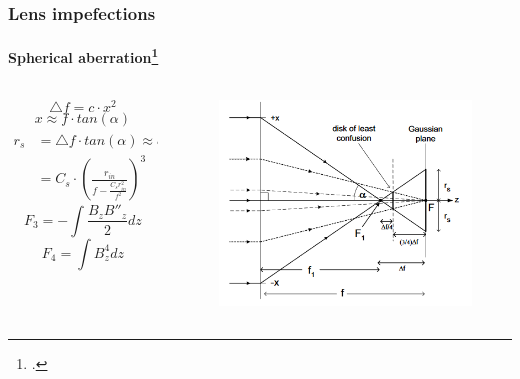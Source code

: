 \begin{frame}
  \frametitle{Lens impefections}
  \framesubtitle{Spherical aberration\footcite{Egerton}}
  \rfn
  \begin{columns}
    \begin{column}{0.4\textwidth}
      \begin{tiny}
      \begin{equation}
        \triangle f=c\cdotp x^{2}
      \end{equation}
      \begin{equation}
        x\approx f\cdotp tan\left(\alpha\right)
      \end{equation}
      \begin{align}
        r_{s}&=\triangle f\cdotp tan\left(\alpha\right)\approx c\cdotp f^{2}tan\left(\alpha\right)^{3}\\
        &=C_{s}\cdotp\left(\frac{r_{in}}{f-\frac{C_{s}r_{in}^{2}}{f^{2}}}\right)^{3}
      \end{align}
      \begin{equation}
        F_{3}=-\int\frac{B_{z}B''_{z}}{2}dz
      \end{equation}
      \begin{equation}
        F_{4}=\int B_{z}^{4}dz
      \end{equation}
      \end{tiny}
    \end{column}
    \begin{column}{0.6\textwidth}
    \begin{figure}[R]
      \includegraphics[width=\textwidth]{Spher_Abb1.png}

\end{figure}
\end{column}
\end{columns}
\end{frame}
